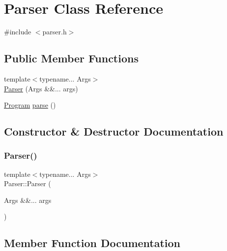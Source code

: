 \hypertarget{class_parser}{}\section{Parser Class Reference}
\label{class_parser}


{\ttfamily \#include $<$parser.\+h$>$}

\subsection*{Public Member Functions}
\begin{DoxyCompactItemize}
\item 
{\footnotesize template$<$typename... Args$>$ }\\\hyperlink{class_parser_aefb50af00ae004bfb809380c45a5ad7d}{Parser} (Args \&\&... args)
\item 
\hyperlink{structast_1_1_program}{Program} \hyperlink{class_parser_a20466f8f29d69499dfa12092cd737211}{parse} ()
\end{DoxyCompactItemize}


\subsection{Constructor \& Destructor Documentation}
\mbox{\label{class_parser_aefb50af00ae004bfb809380c45a5ad7d}} 
\subsubsection{\texorpdfstring{Parser()}{Parser()}}
{\footnotesize\ttfamily template$<$typename... Args$>$ \\
Parser\+::\+Parser (\begin{DoxyParamCaption}\item[{Args \&\&...}]{args }\end{DoxyParamCaption})\hspace{0.3cm}{\ttfamily [inline]}}



\subsection{Member Function Documentation}
\mbox{\label{class_parser_a20466f8f29d69499dfa12092cd737211}} 
